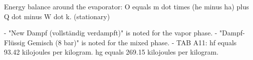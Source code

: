 Energy balance around the evaporator:  
O equals m dot times (he minus ha) plus Q dot minus W dot k.  
(stationary)  

- "New Dampf (vollständig verdampft)" is noted for the vapor phase.  
- "Dampf-Flüssig Gemisch (8 bar)" is noted for the mixed phase.  
- TAB A11:  
  hf equals 93.42 kilojoules per kilogram.  
  hg equals 269.15 kilojoules per kilogram.